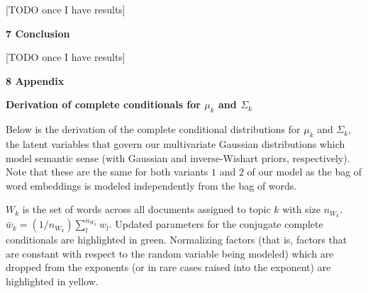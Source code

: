 \documentclass[12pt]{article}
\begin{document}
[TODO once I have results]

\textbf{7 Conclusion}

[TODO once I have results]

\textbf{8 Appendix}

\textbf{Derivation of complete conditionals for $\mu_k$ and $\Sigma_k$}

Below is the derivation of the complete conditional distributions for $\mu_k$ and $\Sigma_k$, the latent variables that govern our multivariate Gaussian distributions which model semantic sense (with Gaussian and inverse-Wishart priors, respectively).  Note that these are the same for both variants $1$ and $2$ of our model as the bag of word embeddings is modeled independently from the bag of words.

$W_k$ is the set of words across all documents assigned to topic $k$ with size $n_{W_k}$.  $\bar{w}_k = (1/n_{W_k})\sum^{n_{W_k}}_l w_l$.  Updated parameters for the conjugate complete conditionals are highlighted in green.  Normalizing factors (that is, factors that are constant with respect to the random variable being modeled) which are dropped from the exponents (or in rare cases raised into the exponent) are highlighted in yellow.
\end{document}
